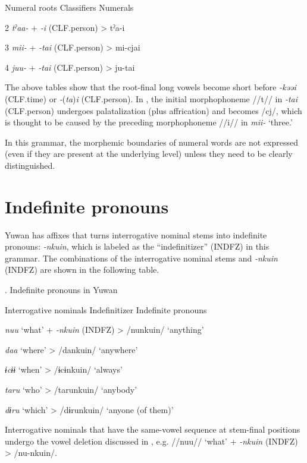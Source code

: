   Numeral roots    Classifiers    Numerals

2  \textit{tˀaa-}  +  \textit{{}-i} (CLF.person)  >  tˀa-i

3  \textit{mii-}  +  \textit{{}-tai} (CLF.person)  >  mi-cjai

4  \textit{juu-}  +  \textit{{}-tai} (CLF.person)  >  ju-tai

The above tables show that the root-final long vowels become short before \textit{{}-kəəi} (CLF.time) or \textit{{}-}(\textit{ta})\textit{i} (CLF.person). In , the initial morphophoneme //t// in \textit{{}-tai} (CLF.person) undergoes palatalization (plus affrication) and becomes /cj/, which is thought to be caused by the preceding morphophoneme //i// in \textit{mii-} ‘three.’

In this grammar, the morphemic boundaries of numeral words are not expressed (even if they are present at the underlying level) unless they need to be clearly distinguished.

\section{Indefinite pronouns}

Yuwan has affixes that turns interrogative nominal stems into indefinite pronouns: \textit{{}-nkuin}, which is labeled as the “indefinitizer” (INDFZ) in this grammar. The combinations of the interrogative nominal stems and \textit{-nkuin} (INDFZ) are shown in the following table.

\begin{styleBeschriftung}
\textmd{}\textmd{. Indefinite pronouns in Yuwan}
\end{styleBeschriftung}

Interrogative nominals    Indefinitizer    Indefinite pronouns

\textit{nuu}  ‘what’  +  \textit{{}-nkuin} (INDFZ)  >  /nunkuin/  ‘anything’

\textit{daa}  ‘where’      >  /dankuin/  ‘anywhere’

\textit{ɨcɨɨ}  ‘when’      >  /ɨcɨnkuin/  ‘always’

\textit{taru}  ‘who’      >  /tarunkuin/  ‘anybody’

\textit{dɨru}  ‘which’      >  /dɨrunkuin/  ‘anyone (of them)’

Interrogative nominals that have the same-vowel sequence at stem-final positions undergo the vowel deletion discussed in , e.g. //nuu// ‘what’ + \textit{{}-nkuin} (INDFZ) > /nu{}-nkuin/.

